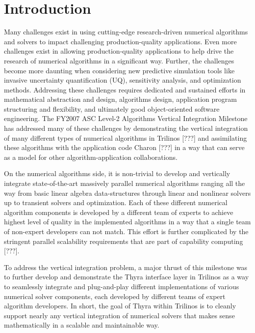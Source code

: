 \documentclass[pdf,ps2pdf,11pt]{SANDreport}
\begin{document}
%

\SANDmain %

%
\section{Introduction}
%

Many challenges exist in using cutting-edge research-driven numerical
algorithms and solvers to impact challenging production-quality applications.
Even more challenges exist in allowing production-quality applications to help
drive the research of numerical algorithms in a significant way.  Further, the
challenges become more daunting when considering new predictive simulation
tools like invasive uncertainty quantification (UQ), sensitivity analysis, and
optimization methods.  Addressing these challenges requires dedicated and
sustained efforts in mathematical abstraction and design, algorithms design,
application program structuring and flexibility, and ultimately good
object-oriented software engineering.  The FY2007 ASC Level-2 Algorithms
Vertical Integration Milestone has addressed many of these challenges by
demonstrating the vertical integration of many different types of numerical
algorithms in Trilinos [???] and assimilating these algorithms with the
application code Charon [???] in a way that can serve as a model for other
algorithm-application collaborations.

On the numerical algorithms side, it is non-trivial to develop and vertically
integrate state-of-the-art massively parallel numerical algorithms ranging all
the way from basic linear algebra data-structures through linear and nonlinear
solvers up to transient solvers and optimization.  Each of these different
numerical algorithm components is developed by a different team of experts to
achieve highest level of quality in the implemented algorithms in a way that a
single team of non-expert developers can not match.  This effort is further
complicated by the stringent parallel scalability requirements that are part
of capability computing [???].

To address the vertical integration problem, a major thrust of this milestone
was to further develop and demonstrate the Thyra interface layer in Trilinos
as a way to seamlessly integrate and plug-and-play different implementations of
various numerical solver components, each developed by different teams of
expert algorithm developers.  In short, the goal of Thyra within Trilinos is
to cleanly support nearly any vertical integration of numerical solvers that
makes sense mathematically in a scalable and maintainable way.
\end{document}
